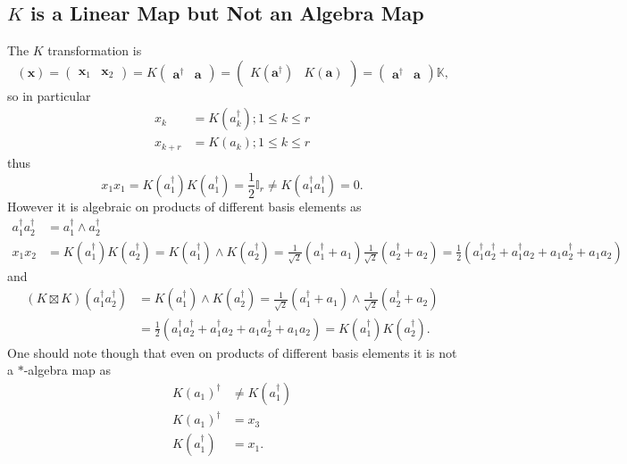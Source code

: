 \documentclass[aps, preprint]{revtex4}
\begin{document}
\subsection{$K$ is a Linear Map but Not an Algebra Map}
The $K$ transformation is
\begin{equation}\left (\mathbf{x}\right ) =\left (\begin{array}{cc}\mathbf{x}_{1} & \mathbf{x}_{2}\end{array}\right ) =K \left (\begin{array}{cc}\mathbf{a}^{ \dag } & \mathbf{a}\end{array}\right ) =\left (\begin{array}{cc}K \left (\mathbf{a}^{ \dag }\right ) & K \left (\mathbf{a}\right )\end{array}\right ) =\left (\begin{array}{cc}\mathbf{a}^{ \dag } & \mathbf{a}\end{array}\right ) \mathbb{K}\text{,}
\end{equation}so in particular
\begin{align}x_{k} &  =K \left (a_{k}^{ \dag }\right ) ;1 \leq k \leq r \\
x_{k +r} &  =K \left (a_{k}\right ) ;1 \leq k \leq r\end{align}thus
\begin{equation}x_{1} x_{1} =K \left (a_{1}^{ \dag }\right ) K \left (a_{1}^{ \dag }\right ) =\frac{1}{2} \mathbb{I}_{r} \neq K \left (a_{1}^{ \dag } a_{1}^{ \dag }\right ) =0.
\end{equation}However it is algebraic on products of different basis elements as
\begin{align}a_{1}^{ \dag } a_{2}^{ \dag } &  =a_{1}^{ \dag } \wedge a_{2}^{ \dag } \\
x_{1} x_{2} &  =K \left (a_{1}^{ \dag }\right ) K \left (a_{2}^{ \dag }\right ) =K \left (a_{1}^{ \dag }\right ) \wedge K \left (a_{2}^{ \dag }\right ) =\frac{1}{\sqrt{2}} \left (a_{1}^{ \dag } +a_{1}\right ) \frac{1}{\sqrt{2}} \left (a_{2}^{ \dag } +a_{2}\right ) =\frac{1}{2} \left (a_{1}^{ \dag } a_{2}^{ \dag } +a_{1}^{ \dag } a_{2} +a_{1} a_{2}^{ \dag } +a_{1} a_{2}\right )\end{align}and
\begin{align}\left (K \boxtimes K\right ) \left (a_{1}^{ \dag } a_{2}^{ \dag }\right ) &  =K \left (a_{1}^{ \dag }\right ) \wedge K \left (a_{2}^{ \dag }\right ) =\frac{1}{\sqrt{2}} \left (a_{1}^{ \dag } +a_{1}\right ) \wedge \frac{1}{\sqrt{2}} \left (a_{2}^{ \dag } +a_{2}\right ) \\
 &  =\frac{1}{2} \left (a_{1}^{ \dag } a_{2}^{ \dag } +a_{1}^{ \dag } a_{2} +a_{1} a_{2}^{ \dag } +a_{1} a_{2}\right ) =K \left (a_{1}^{ \dag }\right ) K \left (a_{2}^{ \dag }\right )\text{.}\end{align}One should note though that even on products of different basis elements it is not a $ \ast $-algebra map as
\begin{align}K \left (a_{1}\right )^{ \dag } &  \neq K \left (a_{1}^{ \dag }\right ) \\
K \left (a_{1}\right )^{ \dag } &  =x_{3} \\
K \left (a_{1}^{ \dag }\right ) &  =x_{1}\text{.}\end{align}
\end{document}
